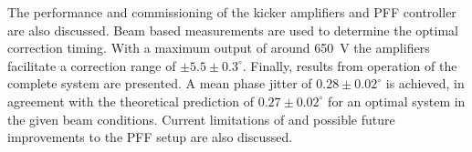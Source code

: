 {The performance and commissioning of the kicker amplifiers and PFF controller are also discussed. Beam based measurements are used to determine the optimal correction timing. With a maximum output of around 650~V the amplifiers facilitate a correction range of \(\pm5.5\pm0.3^\circ\). Finally, results from operation of the complete system are presented. A mean phase jitter of \(0.28\pm0.02^\circ\) is achieved, in agreement with the theoretical prediction of \(0.27\pm0.02^\circ\) for an optimal system in the given beam conditions. Current limitations of and possible future improvements to the PFF setup are also discussed.

}
